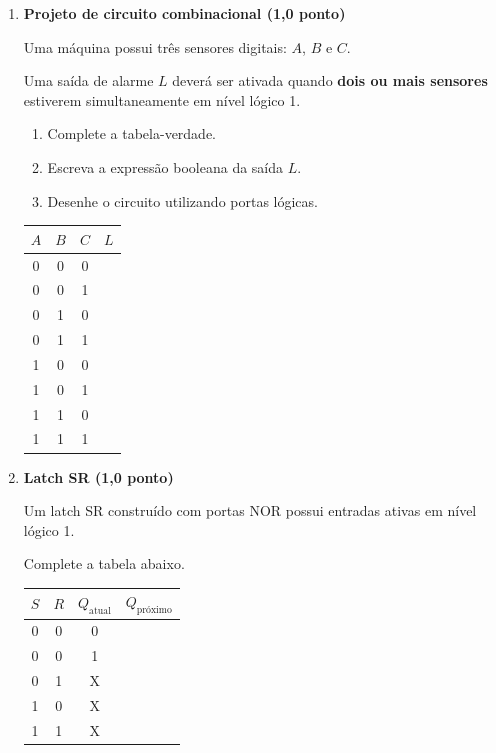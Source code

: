 \documentclass[a4paper,12pt]{article}
\begin{document}
\begin{enumerate}[
    leftmargin=0.8cm,
    label=\textbf{\arabic*.},
    itemsep=0.7cm
]
\item \textbf{Projeto de circuito combinacional \hfill (1,0 ponto)}

Uma máquina possui três sensores digitais: $A$, $B$ e $C$.

Uma saída de alarme $L$ deverá ser ativada quando \textbf{dois ou mais sensores}
estiverem simultaneamente em nível lógico 1.

\begin{enumerate}[label=\alph*)]
    \item Complete a tabela-verdade.
    \item Escreva a expressão booleana da saída $L$.
    \item Desenhe o circuito utilizando portas lógicas.
\end{enumerate}

\begin{center}
\renewcommand{\arraystretch}{1.3}

\begin{tabular}{|c|c|c|c|}
\hline
$A$ & $B$ & $C$ & $L$ \\
\hline
0 & 0 & 0 & \\
\hline
0 & 0 & 1 & \\
\hline
0 & 1 & 0 & \\
\hline
0 & 1 & 1 & \\
\hline
1 & 0 & 0 & \\
\hline
1 & 0 & 1 & \\
\hline
1 & 1 & 0 & \\
\hline
1 & 1 & 1 & \\
\hline
\end{tabular}
\end{center}

\vspace{2.3cm}


\item \textbf{Latch SR \hfill (1,0 ponto)}

Um latch SR construído com portas NOR possui entradas ativas em nível lógico 1.

Complete a tabela abaixo.

\begin{center}
\renewcommand{\arraystretch}{1.5}

\begin{tabular}{|c|c|c|c|}
\hline
$S$ & $R$ & $Q_{\text{atual}}$ & $Q_{\text{próximo}}$ \\
\hline
0 & 0 & 0 & \\
\hline
0 & 0 & 1 & \\
\hline
0 & 1 & X & \\
\hline
1 & 0 & X & \\
\hline
1 & 1 & X & \\
\hline
\end{tabular}
\end{center}


\end{enumerate}
\end{document}
